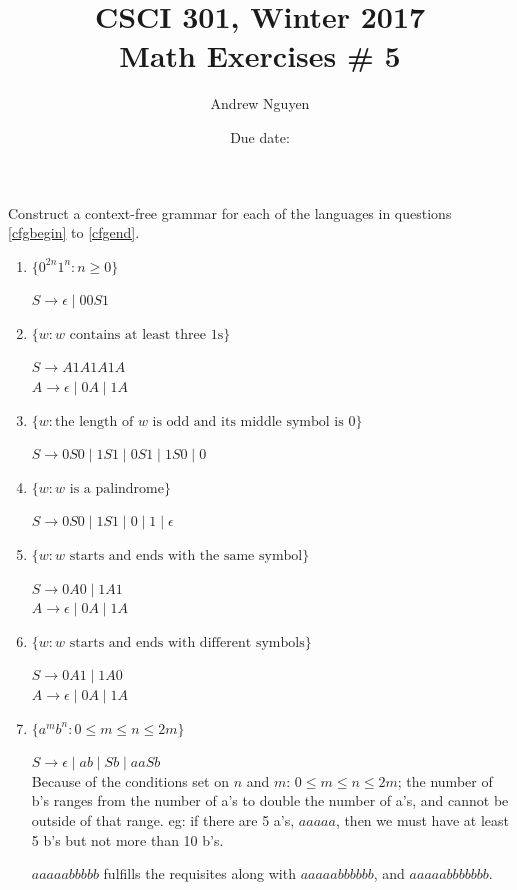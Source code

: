 \documentclass{article}
\title{CSCI 301, Winter 2017\\Math Exercises \# 5}
\author{Andrew Nguyen}
\date{Due date: }
\begin{document}
\maketitle

Construct a context-free grammar for each of the languages
in questions \ref{cfgbegin} to \ref{cfgend}.
\begin{enumerate}
\item \label{cfgbegin}
$\{0^{2n}1^{n} : n \geq 0\}$

$S \rightarrow \epsilon \mid 00S1$

\item $\{w : w \mbox{ contains at least three 1s}\}$

$S \rightarrow A1A1A1A$	\\
$A \rightarrow \epsilon \mid 0A \mid 1A$

\item $\{w : \mbox{the length of $w$ is odd and its middle symbol is 0}\}$

$S \rightarrow 0S0 \mid 1S1 \mid 0S1 \mid 1S0 \mid 0$

\item $\{w : w \mbox{ is a palindrome}\}$

$S \rightarrow 0S0 \mid 1S1 \mid 0 \mid 1 \mid \epsilon$

\item $\{w : w \mbox{ starts and ends with the same symbol}\}$

$S \rightarrow 0A0 \mid 1A1$ \\
$A \rightarrow \epsilon \mid 0A \mid 1A$

\item  $\{w : w \mbox{ starts and ends with different symbols}\}$

$S \rightarrow 0A1 \mid 1A0$ \\
$A \rightarrow \epsilon \mid 0A \mid 1A$


\item \label{cfgend}
$\{a^mb^n : 0 \leq m \leq n \leq 2m\}$

$S \rightarrow \epsilon \mid ab \mid Sb \mid aaSb$\\
Because of the conditions set on $n$ and $m$: $0 \leq m \leq n \leq 2m$; the number of b's ranges from the number of a's to double the number of a's, and cannot be outside of that range. eg: if there are 5 a's, $aaaaa$, then we must have at least 5 b's but not more than 10 b's. 

$aaaaabbbbb$ fulfills the requisites along with $aaaaabbbbbb$, and $aaaaabbbbbbb$.


\end{enumerate}
\end{document}
